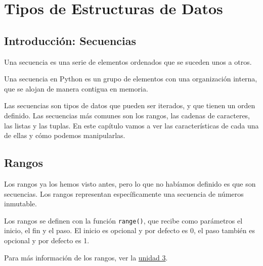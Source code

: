 \documentclass[
  letterpaper,
  DIV=11,
  numbers=noendperiod]{scrreprt}
\begin{document}

\chapter{Tipos de Estructuras de
Datos}\label{tipos-de-estructuras-de-datos}

\section{Introducción: Secuencias}\label{introducciuxf3n-secuencias}

Una secuencia es una serie de elementos ordenados que se suceden unos a
otros.

Una secuencia en Python es un grupo de elementos con una organización
interna, que se alojan de manera contigua en memoria.

Las secuencias son tipos de datos que pueden ser iterados, y que tienen
un orden definido. Las secuencias más comunes son los rangos, las
cadenas de caracteres, las listas y las tuplas. En este capítulo vamos a
ver las características de cada una de ellas y cómo podemos
manipularlas.

\section{Rangos}\label{rangos}

Los rangos ya los hemos visto antes, pero lo que no habíamos definido es
que son secuencias. Los rangos representan específicamente una secuencia
de números inmutable.

Los rangos se definen con la función \texttt{range()}, que recibe como
parámetros el inicio, el fin y el paso. El inicio es opcional y por
defecto es 0, el paso también es opcional y por defecto es 1.

\begin{tcolorbox}[enhanced jigsaw, bottomrule=.15mm, leftrule=.75mm, opacityback=0, colback=white, toprule=.15mm, bottomtitle=1mm, opacitybacktitle=0.6, rightrule=.15mm, left=2mm, arc=.35mm, coltitle=black, title=\textcolor{quarto-callout-note-color}{\faInfo}\hspace{0.5em}{Note}, breakable, toptitle=1mm, colframe=quarto-callout-note-color-frame, titlerule=0mm, colbacktitle=quarto-callout-note-color!10!white]

Para más información de los rangos, ver la \hyperref[ciclo-for]{unidad
3}.

\end{tcolorbox}
\end{document}
